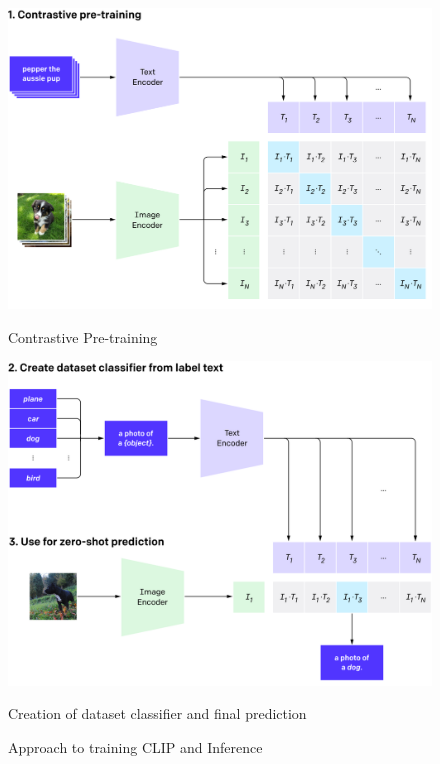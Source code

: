 \begin{figure}[h]
\centering
\begin{minipage}[b]{0.48\textwidth}
\includegraphics[width=\textwidth]{images/overview-a-clip.png}
\caption{Contrastive Pre-training}
\label{fig:contrastive_loss }
\end{minipage}
\hfill
\begin{minipage}[b]{0.45\textwidth}
\includegraphics[width=\textwidth]{images/overview-b-clip.png}
\caption{Creation of dataset classifier and final prediction}
\label{fig:clip_zero }
\end{minipage}
\caption{Approach to training CLIP and Inference \cite{radford2021learningtransferablevisualmodels}}
\label{fig:sidebyside}
\end{figure}

